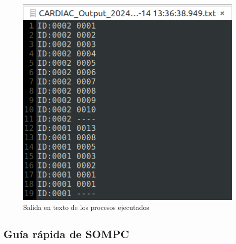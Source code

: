 \documentclass[letterpaper,12pt,oneside]{book}
\begin{document}
			\begin{figure}[h]		
				\centering
				\includegraphics[scale=0.6]{media/Paralela/ouput_vm_pintor_fibonacci.png}
				\caption{Salida en texto de los procesos ejecutados}
				\label{fig:ouput_vm_pintor_fibonacci}
			\end{figure}
			
		\clearpage	 	
	 	
	 	\subsection{Guía rápida de SOMPC}
			
\end{document}
